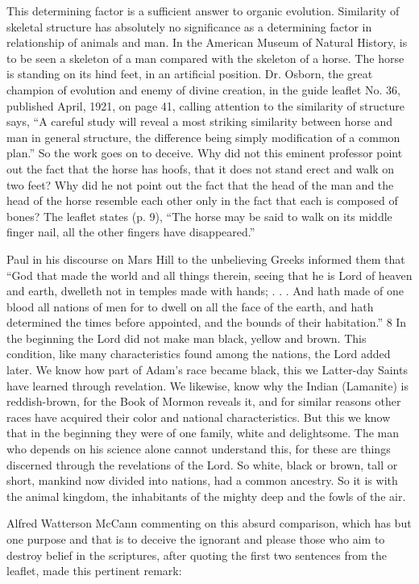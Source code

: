 This determining factor is a sufficient answer to organic evolution. Similarity of skeletal
structure has absolutely no significance as a determining factor in relationship of animals and
man. In the American Museum of Natural History, is to be seen a skeleton of a man
compared with the skeleton of a horse. The horse is standing on its hind feet, in an artificial
position. Dr. Osborn, the great champion of evolution and enemy of divine creation, in the
guide leaflet No. 36, published April, 1921, on page 41, calling attention to the similarity of
structure says, ``A careful study will reveal a most striking similarity between horse and man
in general structure, the difference being simply modification of a common plan.'' So the
work goes on to deceive. Why did not this eminent professor point out the fact that the horse
has hoofs, that it does not stand erect and walk on two feet? Why did he not point out the fact
that the head of the man and the head of the horse resemble each other only in the fact that
each is composed of bones? The leaflet states (p. 9), ``The horse may be said to walk on its
middle finger nail, all the other fingers have disappeared.''

Paul in his discourse on Mars Hill to the unbelieving Greeks informed them that ``God that
made the world and all things therein, seeing that he is Lord of heaven and earth, dwelleth
not in temples made with hands; . . . And hath made of one blood all nations of men for to
dwell on all the face of the earth, and hath determined the times before appointed, and the
bounds of their habitation.'' 8 In the beginning the Lord did not make man black, yellow and
brown. This condition, like many characteristics found among the nations, the Lord added
later. We know how part of Adam's race became black, this we Latter-day Saints have
learned through revelation. We likewise, know why the Indian (Lamanite) is reddish-brown,
for the Book of Mormon reveals it, and for similar reasons other races have acquired their
color and national characteristics. But this we know that in the beginning they were of one
family, white and delightsome. The man who depends on his science alone cannot
understand this, for these are things discerned through the revelations of the Lord. So white,
black or brown, tall or short, mankind now divided into nations, had a common ancestry. So
it is with the animal kingdom, the inhabitants of the mighty deep and the fowls of the air.

Alfred Watterson McCann commenting on this absurd comparison, which has but one
purpose and that is to deceive the ignorant and please those who aim to destroy belief in the
scriptures, after quoting the first two sentences from the leaflet, made this pertinent remark:

